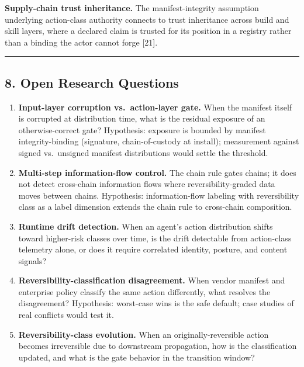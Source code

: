 \documentclass[
  11pt,
]{article}
\begin{document}
\textbf{Supply-chain trust inheritance.} The manifest-integrity
assumption underlying action-class authority connects to trust
inheritance across build and skill layers, where a declared claim is
trusted for its position in a registry rather than a binding the actor
cannot forge {[}21{]}.

\begin{center}\rule{0.5\linewidth}{0.5pt}\end{center}

\subsection{8. Open Research Questions}\label{open-research-questions}

\begin{enumerate}
\def\labelenumi{\arabic{enumi}.}
\item
  \textbf{Input-layer corruption vs.~action-layer gate.} When the
  manifest itself is corrupted at distribution time, what is the
  residual exposure of an otherwise-correct gate? Hypothesis: exposure
  is bounded by manifest integrity-binding (signature, chain-of-custody
  at install); measurement against signed vs.~unsigned manifest
  distributions would settle the threshold.
\item
  \textbf{Multi-step information-flow control.} The chain rule gates
  chains; it does not detect cross-chain information flows where
  reversibility-graded data moves between chains. Hypothesis:
  information-flow labeling with reversibility class as a label
  dimension extends the chain rule to cross-chain composition.
\item
  \textbf{Runtime drift detection.} When an agent's action distribution
  shifts toward higher-risk classes over time, is the drift detectable
  from action-class telemetry alone, or does it require correlated
  identity, posture, and content signals?
\item
  \textbf{Reversibility-classification disagreement.} When vendor
  manifest and enterprise policy classify the same action differently,
  what resolves the disagreement? Hypothesis: worst-case wins is the
  safe default; case studies of real conflicts would test it.
\item
  \textbf{Reversibility-class evolution.} When an originally-reversible
  action becomes irreversible due to downstream propagation, how is the
  classification updated, and what is the gate behavior in the
  transition window?
\end{enumerate}
\end{document}
